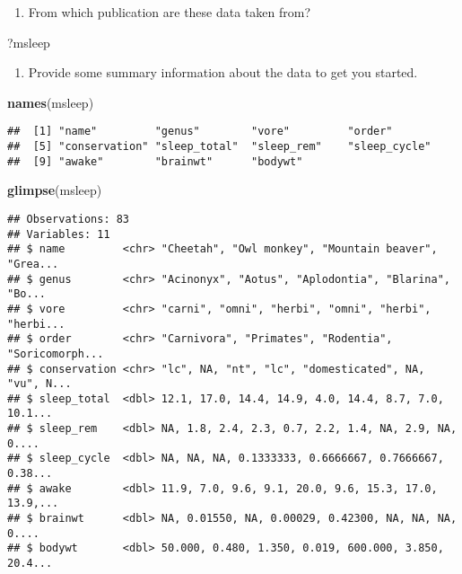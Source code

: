 \documentclass[]{article}
\newenvironment{Shaded}{\begin{snugshade}}{\end{snugshade}}
\newcommand{\KeywordTok}[1]{\textcolor[rgb]{0.13,0.29,0.53}{\textbf{#1}}}
\newcommand{\NormalTok}[1]{#1}
\providecommand{\tightlist}{%
  \setlength{\itemsep}{0pt}\setlength{\parskip}{0pt}}
\begin{document}
\begin{enumerate}
\def\labelenumi{\arabic{enumi}.}
\tightlist
\item
  From which publication are these data taken from?
\end{enumerate}

\begin{Shaded}
\begin{Highlighting}[]
\NormalTok{?msleep}
\end{Highlighting}
\end{Shaded}

\begin{enumerate}
\def\labelenumi{\arabic{enumi}.}
\setcounter{enumi}{1}
\tightlist
\item
  Provide some summary information about the data to get you started.
\end{enumerate}

\begin{Shaded}
\begin{Highlighting}[]
\KeywordTok{names}\NormalTok{(msleep)}
\end{Highlighting}
\end{Shaded}

\begin{verbatim}
##  [1] "name"         "genus"        "vore"         "order"       
##  [5] "conservation" "sleep_total"  "sleep_rem"    "sleep_cycle" 
##  [9] "awake"        "brainwt"      "bodywt"
\end{verbatim}

\begin{Shaded}
\begin{Highlighting}[]
\KeywordTok{glimpse}\NormalTok{(msleep)}
\end{Highlighting}
\end{Shaded}

\begin{verbatim}
## Observations: 83
## Variables: 11
## $ name         <chr> "Cheetah", "Owl monkey", "Mountain beaver", "Grea...
## $ genus        <chr> "Acinonyx", "Aotus", "Aplodontia", "Blarina", "Bo...
## $ vore         <chr> "carni", "omni", "herbi", "omni", "herbi", "herbi...
## $ order        <chr> "Carnivora", "Primates", "Rodentia", "Soricomorph...
## $ conservation <chr> "lc", NA, "nt", "lc", "domesticated", NA, "vu", N...
## $ sleep_total  <dbl> 12.1, 17.0, 14.4, 14.9, 4.0, 14.4, 8.7, 7.0, 10.1...
## $ sleep_rem    <dbl> NA, 1.8, 2.4, 2.3, 0.7, 2.2, 1.4, NA, 2.9, NA, 0....
## $ sleep_cycle  <dbl> NA, NA, NA, 0.1333333, 0.6666667, 0.7666667, 0.38...
## $ awake        <dbl> 11.9, 7.0, 9.6, 9.1, 20.0, 9.6, 15.3, 17.0, 13.9,...
## $ brainwt      <dbl> NA, 0.01550, NA, 0.00029, 0.42300, NA, NA, NA, 0....
## $ bodywt       <dbl> 50.000, 0.480, 1.350, 0.019, 600.000, 3.850, 20.4...
\end{verbatim}
\end{document}

